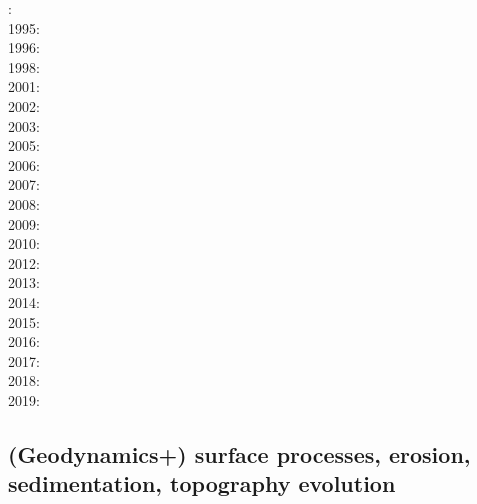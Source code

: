 {\scriptsize
{}:\cite{yusa84}\\
1995:\cite{budi95}\\
1996:\cite{hach96}\\
1998:\cite{copo98}\\
2001:\cite{vapy01}\\
2002:\cite{mumh02}\cite{modm02}\\
2003:\cite{hukm03}\cite{wabu03}\\
2005:\cite{mure05}\\
2006:\cite{kapo06}\cite{mudm06}\\
2007:\cite{kabe07}\\
2008:\cite{baso08}\cite{fukk08}\\
2009:\cite{qurj09}\\
2010:\cite{bepo10}\\
2012:\cite{gerb12}\cite{kasc12}\\
2013:\cite{wahd13}\\
2014:\cite{famc14}\cite{fogm14}\cite{olbe14}\cite{hepk14}\\
2015:\cite{thkp15}\\
2016:\cite{bafl16}\cite{jads16}\cite{olbm16}\cite{bafl16}\\
2017:\cite{pact17}\\
2018:\cite{dusd18}\\
2019:\cite{pact19}
}

\subsection{(Geodynamics+) surface processes, erosion, sedimentation, topography evolution}

